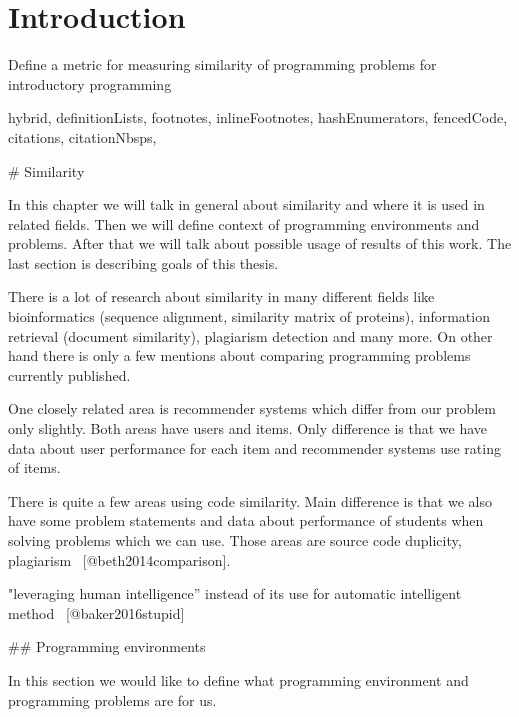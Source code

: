 \documentclass[
  digital, %
  table,   %
  lof,     %
  lot,     %
]{fithesis3}
\begin{document}
\chapter*{Introduction}

Define a metric for measuring similarity of programming problems
for introductory programming

\begin{markdown*}{%
  hybrid,
  definitionLists,
  footnotes,
  inlineFootnotes,
  hashEnumerators,
  fencedCode,
  citations,
  citationNbsps,
}

%
%


%
%

# Similarity

In this chapter we will talk in general about similarity and where it is used in related fields. Then we will define context of programming environments and problems. After that we will talk about possible usage of results of this work. The last section is describing goals of this thesis.

There is a lot of research about similarity in many different fields like bioinformatics (sequence alignment, similarity matrix of proteins), information retrieval (document similarity), plagiarism detection and many more. On other hand there is only a few mentions about comparing programming problems currently published.

One closely related area is recommender systems which differ from our problem only slightly. Both areas have users and items. Only difference is that we have data about user performance for each item and recommender systems use rating of items.

There is quite a few areas using code similarity. Main difference is that we also have some problem statements and data about performance of students when solving problems which we can use. Those areas are source code duplicity, plagiarism ~[@beth2014comparison].

"leveraging human intelligence” instead of its use for automatic intelligent method ~[@baker2016stupid]



## Programming environments

In this section we would like to define what programming environment and programming problems are for us.


\end{markdown*}
\end{document}
